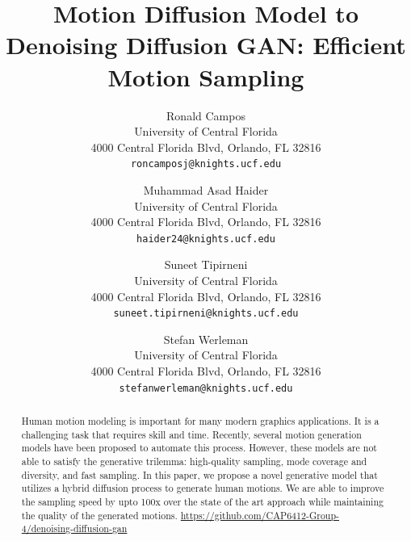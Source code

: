 \documentclass[10pt,twocolumn,letterpaper]{article}
\begin{document}
\title{Motion Diffusion Model to Denoising Diffusion GAN: Efficient Motion Sampling}

\author{
    Ronald Campos\\
    University of Central Florida\\
    4000 Central Florida Blvd, Orlando, FL 32816\\
    {\tt\small roncamposj@knights.ucf.edu}
    \and
    Muhammad Asad Haider\\
    University of Central Florida\\
    4000 Central Florida Blvd, Orlando, FL 32816\\
    {\tt\small haider24@knights.ucf.edu}
    \and
    Suneet Tipirneni\\
    University of Central Florida\\
    4000 Central Florida Blvd, Orlando, FL 32816\\
    {\tt\small suneet.tipirneni@knights.ucf.edu}
    \and
    Stefan Werleman\\
    University of Central Florida\\
    4000 Central Florida Blvd, Orlando, FL 32816\\
    {\tt\small stefanwerleman@knights.ucf.edu}
}


\maketitle

\begin{abstract}
    Human motion modeling is important for many modern graphics applications.
    It is a challenging task that requires skill and time. Recently, several motion generation
    models have been proposed to automate this process. However, these models are not able to 
    satisfy the generative trilemma: high-quality sampling, mode coverage and diversity, and fast sampling.
    In this paper, we propose a novel generative model that utilizes a hybrid diffusion process
    to generate human motions. We are able to improve the sampling speed by upto 100x over the 
    state of the art approach while maintaining the quality of the generated motions.
    \url{https://github.com/CAP6412-Group-4/denoising-diffusion-gan}
\end{abstract}
\end{document}
